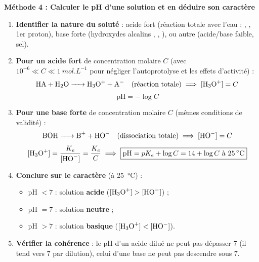 \documentclass[11pt]{article}
\begin{document}
\textbf{Méthode 4 : Calculer le pH d'une solution et en déduire son caractère}\par
\begin{methode}
\begin{enumerate}
\item \textbf{Identifier la nature du soluté} : acide fort (réaction totale avec l'eau : , ,  1er proton), base forte (hydroxydes alcalins , , ), ou autre (acide/base faible, sel).
\item \textbf{Pour un acide fort} de concentration molaire $C$ (avec $10^{-6} \ll C \ll 1\ \si{mol.L^{-1}}$ pour négliger l'autoprotolyse et les effets d'activité) :
\[ \ce{HA + H2O -> H3O+ + A-} \quad (\text{réaction totale}) \implies [\ce{H3O+}] = C \]
\[ \boxed{\text{pH} = -\log C} \]
\item \textbf{Pour une base forte} de concentration molaire $C$ (mêmes conditions de validité) :
\[ \ce{BOH -> B+ + HO-} \quad (\text{dissociation totale}) \implies [\ce{HO-}] = C \]
\[ [\ce{H3O+}] = \frac{K_e}{[\ce{HO-}]} = \frac{K_e}{C} \implies \boxed{\text{pH} = pK_e + \log C = 14 + \log C \ \text{à}\ \SI{25}{\celsius}} \]
\item \textbf{Conclure sur le caractère} (à \SI{25}{\celsius}) :
\begin{itemize}
\item pH $< 7$ : solution \textbf{acide} ($[\ce{H3O+}] > [\ce{HO-}]$) ;
\item pH $= 7$ : solution \textbf{neutre} ;
\item pH $> 7$ : solution \textbf{basique} ($[\ce{H3O+}] < [\ce{HO-}]$).
\end{itemize}
\item \textbf{Vérifier la cohérence} : le pH d'un acide dilué ne peut pas dépasser 7 (il tend vers 7 par dilution), celui d'une base ne peut pas descendre sous 7.
\end{enumerate}
\end{methode}
\end{document}
